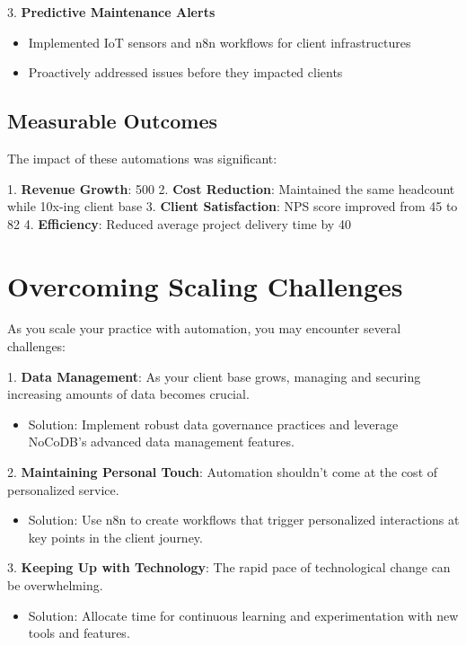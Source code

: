 3. \textbf{Predictive Maintenance Alerts}
\begin{itemize}
    \item Implemented IoT sensors and n8n workflows for client infrastructures
    \item Proactively addressed issues before they impacted clients
\end{itemize}


\subsection{Measurable Outcomes}

The impact of these automations was significant:

1. \textbf{Revenue Growth}: 500%
2. \textbf{Cost Reduction}: Maintained the same headcount while 10x-ing client base
3. \textbf{Client Satisfaction}: NPS score improved from 45 to 82
4. \textbf{Efficiency}: Reduced average project delivery time by 40%


\section{Overcoming Scaling Challenges}

As you scale your practice with automation, you may encounter several challenges:

1. \textbf{Data Management}: As your client base grows, managing and securing increasing amounts of data becomes crucial.
\begin{itemize}
    \item Solution: Implement robust data governance practices and leverage NoCoDB's advanced data management features.
\end{itemize}

2. \textbf{Maintaining Personal Touch}: Automation shouldn't come at the cost of personalized service.
\begin{itemize}
    \item Solution: Use n8n to create workflows that trigger personalized interactions at key points in the client journey.
\end{itemize}

3. \textbf{Keeping Up with Technology}: The rapid pace of technological change can be overwhelming.
\begin{itemize}
    \item Solution: Allocate time for continuous learning and experimentation with new tools and features.
\end{itemize}

